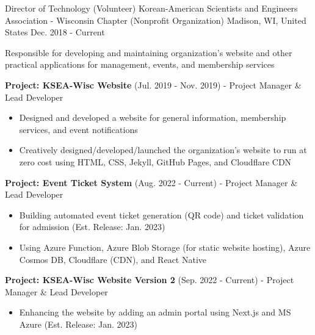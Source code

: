 

\begin{cventries}

  \cventry
  {Director of Technology (Volunteer)} %
  {Korean-American Scientists and Engineers Association - Wisconsin Chapter (Nonprofit Organization)} %
  {Madison, WI, United States} %
  {Dec. 2018 - Current} %
  {
    \begin{cvitems} %
      \item {Responsible for developing and maintaining organization's website and other practical applications for management, events, and membership services}
      \item {\textbf{Project: KSEA-Wisc Website} (Jul. 2019 - Nov. 2019) - Project Manager \& Lead Developer}
      \begin{itemize}[label={}]
        \setlength{\itemindent}{-24pt}
        \item {Designed and developed a website for general information, membership services, and event notifications}
        \item {Creatively designed/developed/launched the organization's website to run at zero cost using HTML, CSS, Jekyll, GitHub Pages, and Cloudflare CDN}
      \end{itemize}
      \item {\textbf{Project: Event Ticket System} (Aug. 2022 - Current) - Project Manager \& Lead Developer}
      \begin{itemize}[label={}]
        \setlength{\itemindent}{-24pt}
        \item {Building automated event ticket generation (QR code) and ticket validation for admission (Est. Release: Jan. 2023)}
        \item {Using Azure Function, Azure Blob Storage (for static website hosting), Azure Cosmos DB, Cloudflare (CDN), and React Native}
      \end{itemize}
      \item {\textbf{Project: KSEA-Wisc Website Version 2} (Sep. 2022 - Current) - Project Manager \& Lead Developer}
      \begin{itemize}[label={}]
        \setlength{\itemindent}{-24pt}
        \item {Enhancing the website by adding an admin portal using Next.js and MS Azure (Est. Release: Jan. 2023)}
      \end{itemize}
    \end{cvitems}
  }


\end{cventries}
